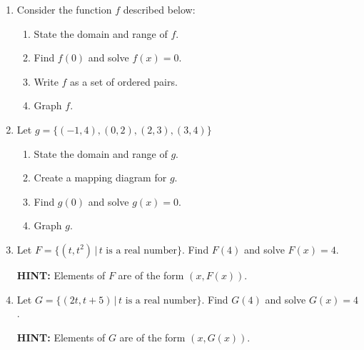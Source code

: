 \documentclass{ximera}
\begin{document}
\begin{enumerate}


\item Consider the function $f$ described below:




\begin{enumerate}

\item  State  the domain and range of $f$.

\item Find $f(0)$ and solve $f(x) = 0$.

\item  Write $f$ as a set of ordered pairs.

\item  Graph $f$.

\end{enumerate}


\item  Let $g = \{ (-1,4), (0,2), (2, 3), (3,4)  \}$

\begin{enumerate}

\item  State the domain and range of $g$.

\item  Create a mapping diagram for $g$.

\item  Find $g(0)$ and solve $g(x) = 0$.

\item  Graph $g$.


\end{enumerate}

\item  Let $F = \{ (t, t^2) \, | \, \text{$t$ is a real number} \}$.  Find $F(4)$ and solve $F(x) = 4$.

\textbf{HINT:}  Elements of $F$ are of the form $(x, F(x))$.

\item  Let $G = \{ (2t, t+5) \, | \, \text{$t$ is a real number} \}$.  Find $G(4)$ and solve $G(x) = 4$.

\textbf{HINT:}  Elements of $G$ are of the form $(x, G(x))$.


\end{enumerate}
\end{document}
